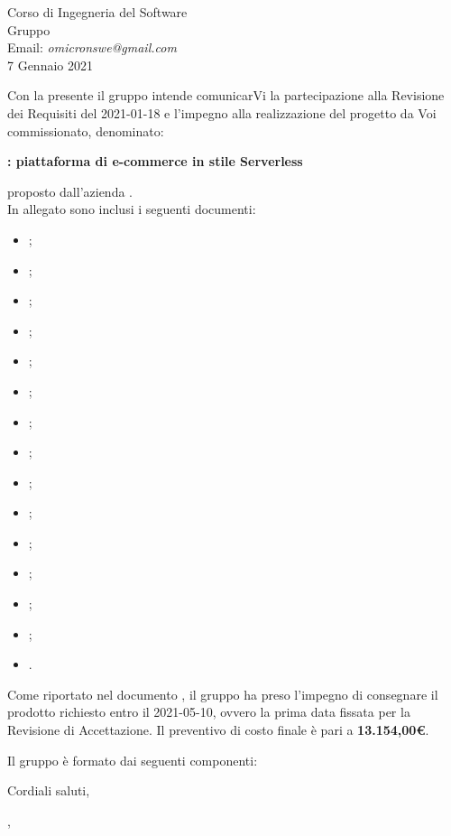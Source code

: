 \documentclass[12pt,a4paper]{letter}
\begin{document}
\begin{letter}
{\begin{flushleft}
			\vspace{1cm}
            Corso di Ingegneria del Software\\ Gruppo \Omicron{}\\ Email:  \textit{omicronswe@gmail.com} \\ 7 Gennaio 2021 
        \end{flushleft}
        }
        \opening{ Con la presente il gruppo \Omicron{} intende comunicarVi la partecipazione alla Revisione dei Requisiti del 2021-01-18 e l'impegno alla realizzazione del progetto da Voi commissionato, denominato:}
        \begin{center}
           \textbf{\nameproject{} : piattaforma di e-commerce in stile Serverless} 
        \end{center}
        proposto dall'azienda \textit{\Proponente{}}.\\
        In allegato sono inclusi i seguenti documenti:
            \begin{itemize}
                \item {};
                \item {};
                \item {};
                \item {};
                \item {};
                \item {};
                \item {};
                \item {};
                \item {};
                \item {};
                \item {};
                \item {};
                \item {};
                \item {};
                \item {}.
            \end{itemize}
        
        Come riportato nel documento , il gruppo ha preso l'impegno di consegnare il prodotto richiesto entro il 2021-05-10, ovvero la prima data fissata per la Revisione di Accettazione. Il preventivo di costo finale è pari a \textbf{13.154,00\euro{}}.
        
        Il gruppo è formato dai seguenti componenti:

        Cordiali saluti,
        \closing{\MB{}, \\ \textit{\respProg{}}}

    \end{letter}
\end{document}

